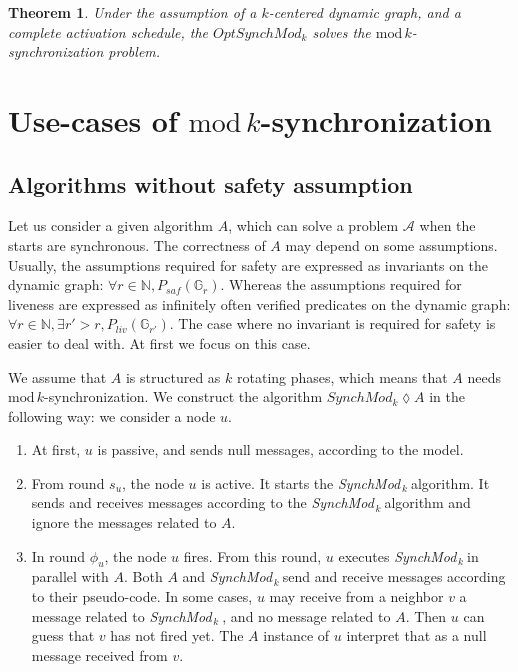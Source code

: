 \documentclass[11pt,letterpaper]{article}
\newtheorem{thm}{Theorem}
\newcommand{\tf}{\phi}
\newcommand{\SM}{{\em SynchMod}$_{\,k}\ $}
\begin{document}
\begin{thm} 
	Under the assumption of a $k$-centered dynamic graph, and a complete activation schedule,
	the $OptSynchMod_k$ solves the $\mathrm{mod}\,k$-synchronization problem.
\end{thm}

\section{Use-cases of $\mathrm{mod}\,k$-synchronization}

\subsection{Algorithms without safety assumption}

Let us consider a given algorithm $A$, which can solve a problem $\mathcal{A}$ when the starts are synchronous.
The correctness of $A$ may depend on some assumptions.
Usually, the assumptions required for safety are expressed as invariants on the dynamic graph: $\forall r \in \mathds{N}, P_{saf}(\mathds{G}_r)$.
Whereas the assumptions required for liveness are expressed as infinitely often verified predicates on the dynamic graph: $\forall r \in \mathds{N}, \exists r' > r, P_{liv}(\mathds{G}_{r'})$.
The case where no invariant is required for safety is easier to deal with. At first we focus on this case.

We assume that $A$ is structured as $k$ rotating phases, which means that $A$ needs $\mathrm{mod}\,k$-synchronization.
We construct the algorithm $SynchMod_k \lozenge A$ in the following way:
we consider a node $u$. 
\begin{enumerate}
	\item At first, $u$ is passive, and sends null messages, according to the model.
	\item From round $s_u$, the node $u$ is active. It starts the \SM algorithm. It sends and receives messages according to the \SM algorithm and ignore the messages related to $A$.
	\item In round $\tf_u$, the node $u$ fires. From this round, $u$ executes \SM in parallel with $A$. Both $A$ and \SM send and receive messages according to their pseudo-code.
		In some cases, $u$ may receive from a neighbor $v$ a message related to \SM, and no message related to $A$. Then $u$ can guess that $v$ has not fired yet.
		The $A$ instance of $u$ interpret that as a null message received from $v$.
\end{enumerate}
\end{document}
